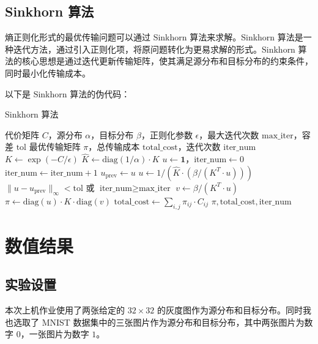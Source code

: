 \documentclass{article}
\begin{document}
\subsection{Sinkhorn 算法}
熵正则化形式的最优传输问题可以通过 Sinkhorn 算法来求解。Sinkhorn 算法是一种迭代方法，通过引入正则化项，将原问题转化为更易求解的形式。Sinkhorn 算法的核心思想是通过迭代更新传输矩阵，使其满足源分布和目标分布的约束条件，同时最小化传输成本。

以下是 Sinkhorn 算法的伪代码：
\begin{algorithm}[H]
    \caption{Sinkhorn 算法}
    \begin{algorithmic}[1]
        \Require 代价矩阵 $C$，源分布 $\alpha$，目标分布 $\beta$，正则化参数 $\epsilon$，最大迭代次数 $\text{max\_iter}$，容差 $\text{tol}$
        \Ensure 最优传输矩阵 $\pi$，总传输成本 $\text{total\_cost}$，迭代次数 $\text{iter\_num}$
        \State $K \gets \exp(-C / \epsilon)$
        \State $\hat{K} \gets \text{diag}(1 / \alpha) \cdot K$
        \State $u \gets \mathbf{1}$，$\text{iter\_num} \gets 0$
        \Repeat
        \State $\text{iter\_num} \gets \text{iter\_num} + 1$
        \State $u_{\text{prev}} \gets u$
        \State $u \gets 1 / (\hat{K} \cdot (\beta / (K^T \cdot u)))$
        \Until $\| u - u_{\text{prev}} \|_\infty < \text{tol}$ 或 $\text{iter\_num} \geq \text{max\_iter}$
        \State $v \gets \beta / (K^T \cdot u)$
        \State $\pi \gets \text{diag}(u) \cdot K \cdot \text{diag}(v)$
        \State $\text{total\_cost} \gets \sum_{i,j} \pi_{ij} \cdot C_{ij}$
        \State \Return $\pi, \text{total\_cost}, \text{iter\_num}$
    \end{algorithmic}
\end{algorithm}

\section{数值结果}
\subsection{实验设置}

本次上机作业使用了两张给定的 $32\times32$ 的灰度图作为源分布和目标分布。同时我也选取了 MNIST 数据集中的三张图片作为源分布和目标分布，其中两张图片为数字 $0$，一张图片为数字 $1$。
\end{document}
